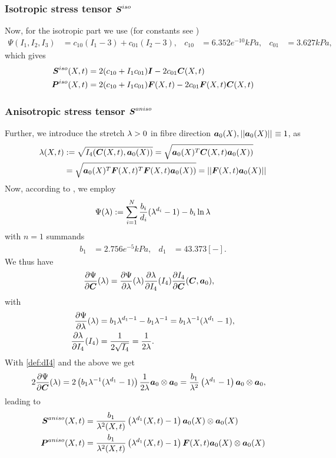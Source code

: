 \subsubsection{Isotropic stress tensor $\boldsymbol{S}^{iso}$}
Now, for the isotropic part we use (for constants see \cite{Zheng1999})
\begin{align*}
	\Psi(I_1,I_2,I_3) &= c_{10}(I_1-3) + c_{01}(I_2-3), & c_{10} &= 6.352e^{-10}kPa, & c_{01} &= 3.627kPa, 
\end{align*}
which gives
\begin{align}
	\boldsymbol{S}^{iso}(X,t) &= 2(c_{10} + I_1c_{01})\boldsymbol{I} - 2c_{01}\boldsymbol{C}(X,t)\\
	\boldsymbol{P}^{iso}(X,t) &= 2(c_{10} + I_1c_{01})\boldsymbol{F}(X,t) - 2c_{01}\boldsymbol{F}(X,t)\boldsymbol{C}(X,t)
\end{align}

\subsubsection{Anisotropic stress tensor $\boldsymbol{S}^{aniso}$}
Further, we introduce the stretch $\lambda > 0$ in fibre direction $\boldsymbol{a}_0(X), \left|\left|\boldsymbol{a}_0(X)\right|\right|_{} \equiv 1$, as
\begin{align}
	\lambda(X,t) &:= \sqrt{I_4(\boldsymbol{C}(X,t),\boldsymbol{a}_0(X))} = \sqrt{\boldsymbol{a}_0(X)^T\boldsymbol{C}(X,t)\boldsymbol{a}_0(X))}\\
	&= \sqrt{\boldsymbol{a}_0(X)^T\boldsymbol{F}(X,t)^T\boldsymbol{F}(X,t)\boldsymbol{a}_0(X))} = \left|\left|\boldsymbol{F}(X,t)\boldsymbol{a}_0(X)\right|\right|_{}\label{def:fibrestretch}
\end{align}
Now, according to \cite{Markert2005}, we employ
\begin{align}
	\Psi(\lambda) := \sum\limits_{i=1}^{N} \frac{b_i}{d_i}(\lambda^{d_i} - 1) - b_i\ln\lambda\label{def:markertlaw}
\end{align}
with $n=1$ summands 
\begin{align*}
	b_1 &= 2.756e^{-5}kPa, & d_1 &= 43.373 [-].
\end{align*}
We thus have
\begin{align}
	\frac{\partial \Psi}{\partial \boldsymbol{C}}(\lambda) &= \frac{\partial \Psi}{\partial \lambda}(\lambda)\frac{\partial \lambda}{\partial I_4}(I_4)\frac{\partial I_4}{\partial \boldsymbol{C}}(\boldsymbol{C},\boldsymbol{a}_0),\label{eq:dpsidC}
\end{align}
with
\begin{align*}
		 \frac{\partial \Psi}{\partial \lambda}(\lambda) &= b_1\lambda^{d_1-1} - b_1\lambda^{-1} = b_1\lambda^{-1}(\lambda^{d_1} - 1),\\
		 \frac{\partial \lambda}{\partial I_4}(I_4) &= \frac{1}{2\sqrt{I_4}} = \frac{1}{2\lambda}.
\end{align*}
With \eqref{def:dI4} and the above we get
\begin{align*}
	2\frac{\partial \Psi}{\partial \boldsymbol{C}}(\lambda) &= 2\left(b_1\lambda^{-1}(\lambda^{d_1} - 1)\right) \frac{1}{2\lambda}\boldsymbol{a}_0\otimes\boldsymbol{a}_0
	= \frac{b_1}{\lambda^2}\left(\lambda^{d_1} - 1\right) \boldsymbol{a}_0\otimes\boldsymbol{a}_0,
\end{align*}
leading to
\begin{align}
	\boldsymbol{S}^{aniso}(X,t) &= \frac{b_1}{\lambda^2(X,t)}\left(\lambda^{d_1}(X,t) - 1\right) \boldsymbol{a}_0(X)\otimes\boldsymbol{a}_0(X)\\
	\boldsymbol{P}^{aniso}(X,t) &= \frac{b_1}{\lambda^2(X,t)}\left(\lambda^{d_1}(X,t) - 1\right) \boldsymbol{F}(X,t)\boldsymbol{a}_0(X)\otimes\boldsymbol{a}_0(X)
\end{align}

